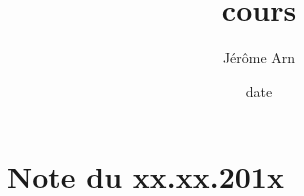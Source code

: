 \documentclass{article}
\title{cours}
\author{Jérôme Arn}
\date{date}
\begin{document}
\maketitle
\newpage

\tableofcontents
\newpage

\section{Note du xx.xx.201x}
\end{document}
